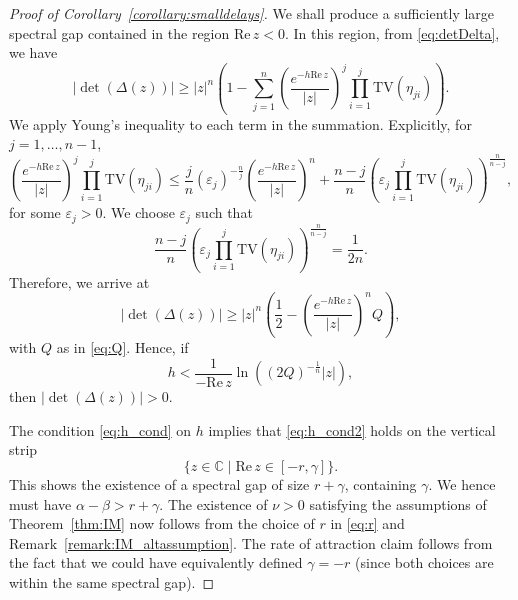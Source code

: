 \documentclass[a4paper, 12pt, oneside, reqno, notitlepage]{amsart}
\theoremstyle{plain}
\theoremstyle{definition}
\theoremstyle{remark}
\begin{document}
\begin{proof}[Proof of Corollary~\ref{corollary:smalldelays}]
    We shall produce a sufficiently large spectral gap contained in the region $\mathrm{Re} \, z < 0$.
    In this region, from \eqref{eq:detDelta}, we have
    \begin{displaymath}
        |\det(\Delta (z))| \geq |z|^n \left( 1 - \sum_{j=1}^n \left( \frac{e^{-h \mathrm{Re} \, z}}{|z|}\right)^j \prod_{i =1}^j \mathrm{TV}(\eta_{ji})  \right).
    \end{displaymath}
    We apply Young's inequality to each term in the summation.
    Explicitly, for $j = 1,\ldots,n-1$, 
    \begin{displaymath}
        \left( \frac{e^{-h \mathrm{Re} \, z}}{|z|}\right)^j \prod_{i =1}^j \mathrm{TV}(\eta_{ji}) \leq \frac{j}{n} (\varepsilon_j)^{-\frac{n}{j}} \left( \frac{e^{-h \mathrm{Re} \, z}}{|z|}\right)^n  + \frac{n-j}{n} \left( \varepsilon_j \prod_{i =1}^j \mathrm{TV}(\eta_{ji}) \right)^{\frac{n}{n-j}},
    \end{displaymath}
    for some $\varepsilon_j >0$.
    We choose $\varepsilon_j$ such that
    \begin{displaymath}
        \frac{n-j}{n} \left( \varepsilon_j \prod_{i =1}^j \mathrm{TV}(\eta_{ji}) \right)^{\frac{n}{n-j}} = \frac{1}{2n}.
    \end{displaymath}
    Therefore, we arrive at
    \begin{displaymath}
       |\det(\Delta (z))| \geq |z|^n \left( \frac{1}{2} -  \left( \frac{e^{-h \mathrm{Re} \, z}}{|z|}\right)^n Q \right),
    \end{displaymath}
    with $Q$ as in \eqref{eq:Q}.
    Hence, if 
    \begin{equation}
        h < \frac{1}{-\mathrm{Re} \, z} \ln \left( (2Q)^{-\frac{1}{n}} |z|\right),
        \label{eq:h_cond2}
    \end{equation}
    then $|\det(\Delta (z))| > 0$. 

    The condition \eqref{eq:h_cond} on $h$ implies that \eqref{eq:h_cond2} holds on the vertical strip 
    \begin{displaymath}
        \{ z \in \mathbb{C} \; | \; \mathrm{Re} \, z \in [-r,\gamma] \}.
    \end{displaymath}
    This shows the existence of a spectral gap of size $r+\gamma$, containing $\gamma$.
    We hence must have $\alpha - \beta >r + \gamma$.
    The existence of $\nu>0$ satisfying the assumptions of Theorem~\ref{thm:IM} now follows from the choice of $r$ in \eqref{eq:r} and Remark~\ref{remark:IM_altassumption}.
    The rate of attraction claim follows from the fact that we could have equivalently defined $\gamma = -r$ (since both choices are within the same spectral gap).
\end{proof}
\end{document}
